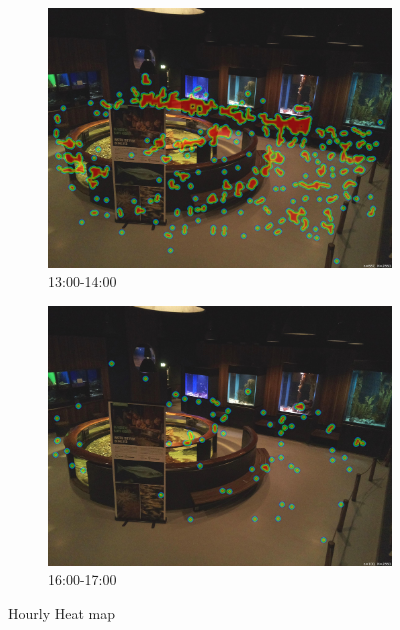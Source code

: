 \begin{figure}[H]
    \centering
    \begin{subfigure}{0.475\textwidth}
        \centering
        \includegraphics[width=\textwidth]{Images/Analytics/heatmap_time_1300_1400.jpg}
        \caption{13:00-14:00}
    \end{subfigure}
    \hfill
    \begin{subfigure}{0.475\textwidth}
        \centering
        \includegraphics[width=\textwidth]{Images/Analytics/heatmap_time_1600_1700.jpg}
        \caption{16:00-17:00}
    \end{subfigure}
    \caption{Hourly Heat map}
    \label{fig:heat_map_time}
\end{figure}

